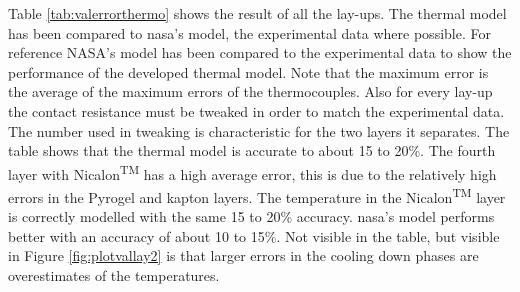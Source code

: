 Table \ref{tab:valerrorthermo} shows the result of all the lay-ups. The thermal model has been compared to \gls{nasa}'s model, the experimental data where possible. For reference NASA's model has been compared to the experimental data to show the performance of the developed thermal model. Note that the maximum error is the average of the maximum errors of the thermocouples. Also for every lay-up the contact resistance must be tweaked in order to match the experimental data. The number used in tweaking is characteristic for the two layers it separates. The table shows that the thermal model is accurate to about 15 to 20\%. The fourth layer with Nicalon\textsuperscript{TM} has a high average error, this is due to the relatively high errors in the Pyrogel\textsuperscript{\textregistered} and kapton layers. The temperature in the Nicalon\textsuperscript{TM} layer is correctly modelled with the same 15 to 20\% accuracy. \gls{nasa}'s model performs better with an accuracy of about 10 to 15\%. Not visible in the table, but visible in Figure \ref{fig:plotvallay2} is that larger errors in the cooling down phases are overestimates of the temperatures.

